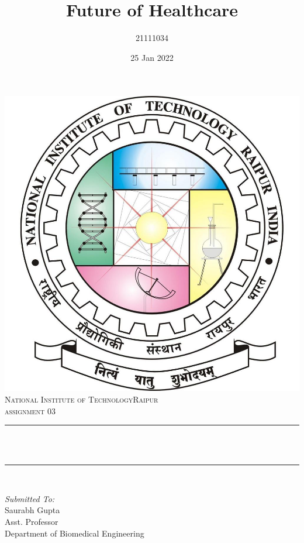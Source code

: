 \documentclass[12pt]{article}
\title{Future of Healthcare}								%
\author{21111034}								%
\date{25 Jan 2022}											%
\makeatletter
\let\thetitle\@title
\makeatother
\begin{document}

\begin{titlepage}
	\centering
    \vspace*{0.5 cm}
    \includegraphics[scale = 0.20]{logo.jpeg}\\[1.0 cm]	%
    \textsc{\LARGE  National Institute of Technology\newline\newline Raipur}\\[2.0 cm]	%
	\textsc{\Large assignment 03}\\[0.5 cm]				%
	\rule{\linewidth}{0.2 mm} \\[0.4 cm]
	{ \huge \bfseries \thetitle}\\
	\rule{\linewidth}{0.2 mm} \\[1.5 cm]
	
	\begin{minipage}{0.4\textwidth}
		\begin{flushleft} \large
			\emph{Submitted To:}\\
			Saurabh Gupta\\
            Asst. Professor\\
            Department of Biomedical Engineering\\
			\end{flushleft}
			\end{minipage}~
			\begin{minipage}{0.4\textwidth}
            

\end{minipage}
\end{titlepage}
\end{document}
